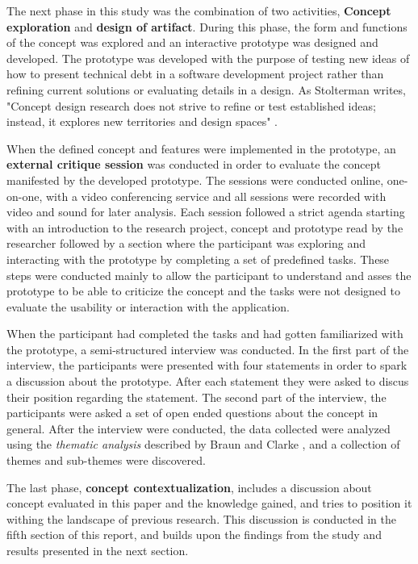 The next phase in this study was the combination of two activities, \textbf{Concept exploration}  and \textbf{design of artifact}.
During this phase, the form and functions of the concept was explored and an interactive prototype was designed and developed.
The prototype was developed with the purpose of testing new ideas of how to present technical debt in a software development project rather than refining current solutions or evaluating details in a design.
As Stolterman writes, "Concept design research does not strive to refine or test established ideas; instead, it explores new territories and design spaces" \cite{stolterman_concept-driven_2010}.

When the defined concept and features were implemented in the prototype, an \textbf{external critique session} was conducted in order to evaluate the concept manifested by the developed prototype.
The sessions were conducted online, one-on-one, with a video conferencing service and all sessions were recorded with video and sound for later analysis.
Each session followed a strict agenda starting with an introduction to the research project, concept and prototype read by the researcher followed by a section where the participant was exploring and interacting with the prototype by completing a set of predefined tasks.
These steps were conducted mainly to allow the participant to understand and asses the prototype to be able to criticize the concept and the tasks were not designed to evaluate the usability or interaction with the application.

When the participant had completed the tasks and had gotten familiarized with the prototype, a semi-structured interview was conducted.
In the first part of the interview, the participants were presented with four statements in order to spark a discussion about the prototype.
After each statement they were asked to discus their position regarding the statement.
The second part of the interview, the participants were asked a set of open ended questions about the concept in general.
After the interview were conducted, the data collected were analyzed using the \textit{thematic analysis} described by Braun and Clarke \cite{braun_using_2006}, and a collection of themes and sub-themes were discovered.

The last phase, \textbf{concept contextualization}, includes a discussion about concept evaluated in this paper and the knowledge gained, and tries to position it withing the landscape of previous research. This discussion is conducted in the fifth section of this report, and builds upon the findings from the study and results presented in the next section.